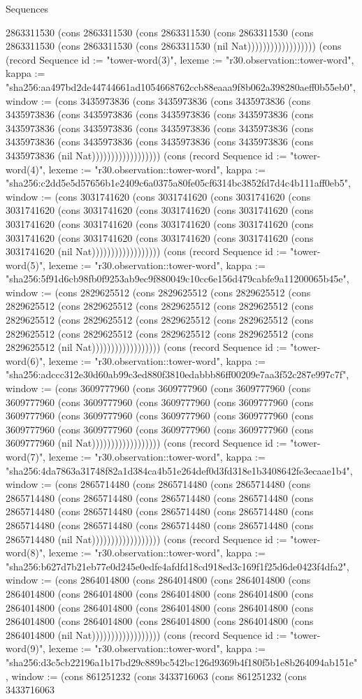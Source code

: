 \begin{lexlean}{Sequences}
\begin{semanticmodule}
{2863311530 (cons 2863311530 (cons 2863311530 (cons 2863311530 (cons 2863311530 (cons 2863311530 (cons 2863311530 (nil Nat)))))))))))))))))}) (cons (record Sequence {id := "tower-word(3)", lexeme := "r30.observation::tower-word", kappa := "sha256:aa497bd2de44744661ad1054668762ccb88eaaa9f8b062a398280aeff0b55eb0", window := (cons 3435973836 (cons 3435973836 (cons 3435973836 (cons 3435973836 (cons 3435973836 (cons 3435973836 (cons 3435973836 (cons 3435973836 (cons 3435973836 (cons 3435973836 (cons 3435973836 (cons 3435973836 (cons 3435973836 (cons 3435973836 (cons 3435973836 (cons 3435973836 (nil Nat)))))))))))))))))}) (cons (record Sequence {id := "tower-word(4)", lexeme := "r30.observation::tower-word", kappa := "sha256:c2dd5e5d57656b1e2409c6a0375a80fe05cf6314bc3852fd7d4c4b111aff0eb5", window := (cons 3031741620 (cons 3031741620 (cons 3031741620 (cons 3031741620 (cons 3031741620 (cons 3031741620 (cons 3031741620 (cons 3031741620 (cons 3031741620 (cons 3031741620 (cons 3031741620 (cons 3031741620 (cons 3031741620 (cons 3031741620 (cons 3031741620 (cons 3031741620 (nil Nat)))))))))))))))))}) (cons (record Sequence {id := "tower-word(5)", lexeme := "r30.observation::tower-word", kappa := "sha256:5f91d6cb98fb0f9253ab9ec9f880049c10cc6e156d479cabfe9a11200065b45e", window := (cons 2829625512 (cons 2829625512 (cons 2829625512 (cons 2829625512 (cons 2829625512 (cons 2829625512 (cons 2829625512 (cons 2829625512 (cons 2829625512 (cons 2829625512 (cons 2829625512 (cons 2829625512 (cons 2829625512 (cons 2829625512 (cons 2829625512 (cons 2829625512 (nil Nat)))))))))))))))))}) (cons (record Sequence {id := "tower-word(6)", lexeme := "r30.observation::tower-word", kappa := "sha256:adccc312e30d60ab99c3ed880f3810edabbb86ff00209e7aa3f52c287e997c7f", window := (cons 3609777960 (cons 3609777960 (cons 3609777960 (cons 3609777960 (cons 3609777960 (cons 3609777960 (cons 3609777960 (cons 3609777960 (cons 3609777960 (cons 3609777960 (cons 3609777960 (cons 3609777960 (cons 3609777960 (cons 3609777960 (cons 3609777960 (cons 3609777960 (nil Nat)))))))))))))))))}) (cons (record Sequence {id := "tower-word(7)", lexeme := "r30.observation::tower-word", kappa := "sha256:4da7863a31748f82a1d384ca4b51e264def0d3fd318e1b3408642fe3ecaae1b4", window := (cons 2865714480 (cons 2865714480 (cons 2865714480 (cons 2865714480 (cons 2865714480 (cons 2865714480 (cons 2865714480 (cons 2865714480 (cons 2865714480 (cons 2865714480 (cons 2865714480 (cons 2865714480 (cons 2865714480 (cons 2865714480 (cons 2865714480 (cons 2865714480 (nil Nat)))))))))))))))))}) (cons (record Sequence {id := "tower-word(8)", lexeme := "r30.observation::tower-word", kappa := "sha256:b627d7b21eb77e0d245e0edfe4afdfd18cd918ed3c169f1f25d6de0423f4dfa2", window := (cons 2864014800 (cons 2864014800 (cons 2864014800 (cons 2864014800 (cons 2864014800 (cons 2864014800 (cons 2864014800 (cons 2864014800 (cons 2864014800 (cons 2864014800 (cons 2864014800 (cons 2864014800 (cons 2864014800 (cons 2864014800 (cons 2864014800 (cons 2864014800 (nil Nat)))))))))))))))))}) (cons (record Sequence {id := "tower-word(9)", lexeme := "r30.observation::tower-word", kappa := "sha256:d3c5cb22196a1b17bd29c889bc542bc126d9369b4f180f5b1e8b264094ab151e", window := (cons 861251232 (cons 3433716063 (cons 861251232 (cons 3433716063 }
\end{semanticmodule}
\end{lexlean}
